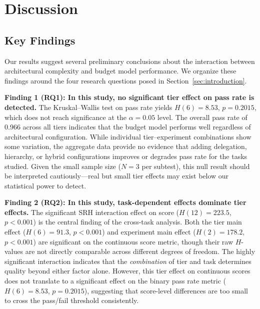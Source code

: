 \documentclass[11pt]{article}
\begin{document}
\section{Discussion}
\label{sec:discussion}

\subsection{Key Findings}
\label{sec:key_findings}

Our results suggest several preliminary conclusions about the interaction
between architectural complexity and budget model performance. We organize
these findings around the four research questions posed in
Section~\ref{sec:introduction}.

\textbf{Finding 1 (RQ1): In this study, no significant tier effect on pass rate is detected.}
The Kruskal--Wallis test on pass rate yields $H(6)=8.53$, $p=0.2015$, which
does not reach significance at the $\alpha=0.05$ level. The overall pass rate
of 0.966 across all tiers indicates that the budget model performs well
regardless of architectural configuration. While individual tier--experiment
combinations show some variation, the aggregate data provide no evidence that
adding delegation, hierarchy, or hybrid configurations improves or degrades
pass rate for the tasks studied. Given the small sample size ($N=3$ per
subtest), this null result should be interpreted cautiously---real but small
tier effects may exist below our statistical power to detect.

\textbf{Finding 2 (RQ2): In this study, task-dependent effects dominate tier effects.}
The significant SRH interaction effect on score ($H(12) = 223.5$, $p < 0.001$)
is the central finding of the cross-task analysis. Both the tier main effect
($H(6) = 91.3$, $p < 0.001$) and experiment main effect ($H(2) = 178.2$,
$p < 0.001$) are significant on the continuous score metric, though their raw
$H$-values are not directly comparable across different degrees of freedom.
The highly significant interaction indicates that the \emph{combination} of
tier and task determines quality beyond either factor alone. However, this
tier effect on continuous scores does not translate to a significant effect on
the binary pass rate metric ($H(6)=8.53$, $p=0.2015$), suggesting that
score-level differences are too small to cross the pass/fail threshold
consistently.
\end{document}
